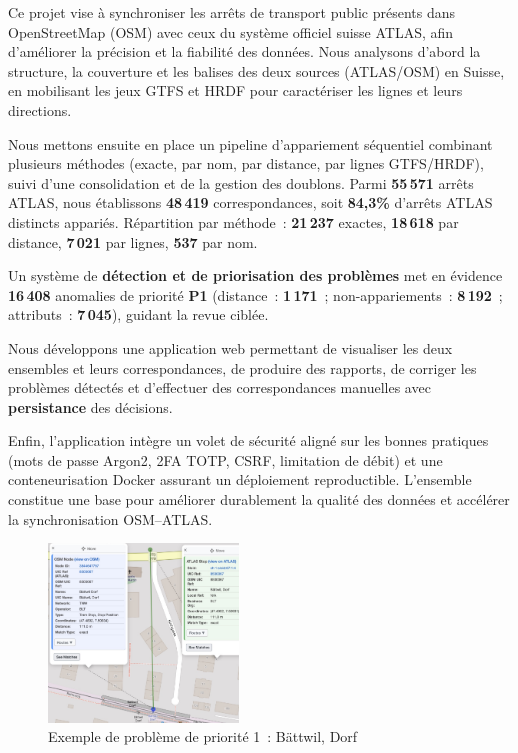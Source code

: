 \begin{spacing}{0.92}
\vspace{-0.5cm}

Ce projet vise à synchroniser les arrêts de transport public présents dans OpenStreetMap (OSM) avec ceux du système officiel suisse ATLAS, afin d’améliorer la précision et la fiabilité des données. Nous analysons d’abord la structure, la couverture et les balises des deux sources (ATLAS/OSM) en Suisse, en mobilisant les jeux GTFS et HRDF pour caractériser les lignes et leurs directions.

Nous mettons ensuite en place un pipeline d’appariement séquentiel combinant plusieurs méthodes (exacte, par nom, par distance, par lignes GTFS/HRDF), suivi d’une consolidation et de la gestion des doublons. Parmi \textbf{55\,571} arrêts ATLAS, nous établissons \textbf{48\,419} correspondances, soit \textbf{84,3\%} d’arrêts ATLAS distincts appariés. Répartition par méthode : \textbf{21\,237} exactes, \textbf{18\,618} par distance, \textbf{7\,021} par lignes, \textbf{537} par nom.

Un système de \textbf{détection et de priorisation des problèmes} met en évidence \textbf{16\,408} anomalies de priorité \textbf{P1} (distance : \textbf{1\,171} ; non-appariements : \textbf{8\,192} ; attributs : \textbf{7\,045}), guidant la revue ciblée.

Nous développons une application web permettant de visualiser les deux ensembles et leurs correspondances, de produire des rapports, de corriger les problèmes détectés et d’effectuer des correspondances manuelles avec \textbf{persistance} des décisions.

Enfin, l'application intègre un volet de sécurité aligné sur les bonnes pratiques (mots de passe Argon2, 2FA TOTP, CSRF, limitation de débit) et une conteneurisation Docker assurant un déploiement reproductible.  L'ensemble constitue une base pour améliorer durablement la qualité des données et accélérer la synchronisation OSM–ATLAS.

\vspace{0.2cm}
\begin{figure}[h]
\centering
\includegraphics[width=0.45\textwidth]{figures/abstract.jpg}
\caption*{Exemple de problème de priorité 1~: Bättwil, Dorf}
\end{figure}
\vspace{0.1cm}


\end{spacing}
